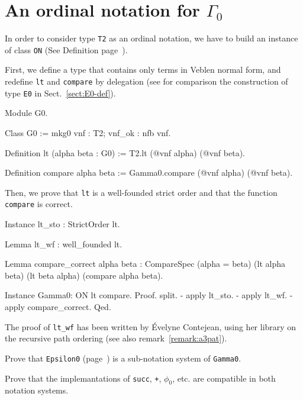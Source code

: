 {\section{An ordinal notation for \texorpdfstring{$\Gamma_0$}{\texttt{Gamma0}}}

In order to consider type \texttt{T2} as an ordinal notation, we have to build an instance of class \texttt{ON} (See Definition page~\pageref{types:ON}).

First, we define a type that contains only terms in Veblen normal form, and redefine \texttt{lt} and \texttt{compare} by delegation (see for comparison the construction of type \texttt{E0} in Sect.~\vref{sect:E0-def}).

\begin{Coqsrc}
Module G0.

Class G0 := mkg0 {vnf : T2; vnf_ok : nfb vnf}.

Definition lt (alpha beta : G0) := T2.lt (@vnf alpha) (@vnf beta).

Definition compare alpha beta := Gamma0.compare (@vnf alpha) (@vnf beta).
\end{Coqsrc}

Then, we prove that \texttt{lt} is a well-founded strict order and that the
function \texttt{compare} is correct.

\begin{Coqsrc}
Instance lt_sto : StrictOrder lt.

Lemma lt_wf : well_founded lt.

Lemma compare_correct alpha beta :
  CompareSpec (alpha = beta) (lt alpha beta) (lt beta alpha)
              (compare alpha beta).

Instance Gamma0: ON lt  compare.
Proof.
  split.
  - apply lt_sto.
  - apply lt_wf. 
  - apply compare_correct.
Qed.
\end{Coqsrc}


\begin{remark}
The proof of \texttt{lt\_wf} has been written by \'Evelyne Contejean, using her library on the recursive path ordering (see also remark~\vref{remark:a3pat}).
\end{remark}

\begin{project}
Prove that \texttt{Epsilon0} (page~\pageref{instance-epsilon0})
is a sub-notation system of \texttt{Gamma0}.

Prove that the implemantations of \texttt{succ}, \texttt{+}, $\phi_0$, etc.
are compatible in both notation systems.


\end{project}}
